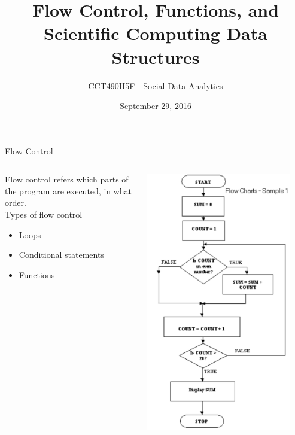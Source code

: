 \documentclass{beamer}
\title[Flow Control, Functions, Data Structures]
{Flow Control, Functions, and Scientific Computing Data Structures}
\author{CCT490H5F - Social Data Analytics}
\institute[] {
    Professor Alex Hanna
}
\date[] {
September 29, 2016
}
\begin{document}
\begin{frame}
  \titlepage
\end{frame}

\begin{frame}{Flow Control}
    \begin{columns}
        \begin{column}{0.5\textwidth}
            Flow control refers which parts of the program are executed, in what order. \\
            \vspace*{1em}
            Types of flow control
            \begin{itemize}[<2->]
                \item Loops
                \item Conditional statements
                \item Functions
            \end{itemize}
        \end{column}
        \begin{column}{0.4\textwidth}
            \includegraphics[width=0.9\textwidth]{img/flow-chart.pdf}
        \end{column}
    \end{columns}
\end{frame}
\end{document}
